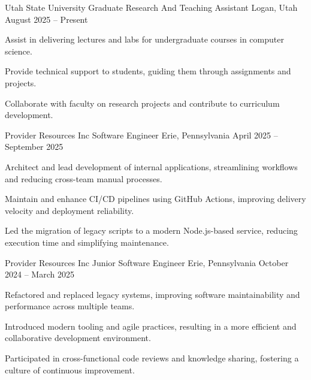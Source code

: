 \documentclass[10pt, a4paper]{russell}
\begin{document}
\begin{cventries}

    \cventry
        {Utah State University}
        {Graduate Research And Teaching Assistant}
        {Logan, Utah}
        {August 2025 – Present}
        {
            \begin{cvitems}
                \item Assist in delivering lectures and labs for undergraduate courses in computer science.
                \item Provide technical support to students, guiding them through assignments and projects.
                \item Collaborate with faculty on research projects and contribute to curriculum development.
            \end{cvitems}
        }

    \cventry
        {Provider Resources Inc}
        {Software Engineer}
        {Erie, Pennsylvania}
        {April 2025 – September 2025}
        {
            \begin{cvitems}
                \item Architect and lead development of internal applications, streamlining workflows and reducing cross-team manual processes.
                \item Maintain and enhance CI/CD pipelines using GitHub Actions, improving delivery velocity and deployment reliability.
                \item Led the migration of legacy scripts to a modern Node.js-based service, reducing execution time and simplifying maintenance.
            \end{cvitems}
        }

    \cventry
        {Provider Resources Inc}
        {Junior Software Engineer}
        {Erie, Pennsylvania}
        {October 2024 – March 2025}
        {
            \begin{cvitems}
                \item Refactored and replaced legacy systems, improving software maintainability and performance across multiple teams.
                \item Introduced modern tooling and agile practices, resulting in a more efficient and collaborative development environment.
                \item Participated in cross-functional code reviews and knowledge sharing, fostering a culture of continuous improvement.
            \end{cvitems}
        }

\end{cventries}
\end{document}
